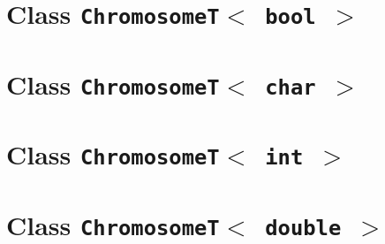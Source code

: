 \documentclass{report}
\begin{document}


\clearpage



\clearpage
\chapter{Class {\tt ChromosomeT$<$ bool $>$}}



\clearpage



\clearpage
\chapter{Class {\tt ChromosomeT$<$ char $>$}}




\clearpage
\chapter{Class {\tt ChromosomeT$<$ int $>$}}



\clearpage



\clearpage
\chapter{Class {\tt ChromosomeT$<$ double $>$}}
\end{document}
